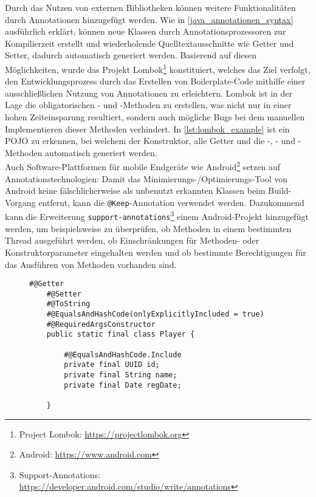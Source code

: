 \noindent Durch das Nutzen von externen Bibliotheken können weitere Funktionalitäten durch Annotationen hinzugefügt werden. Wie in \autoref{java_annotationen_syntax} ausführlich erklärt, können neue Klassen durch Annotationsprozessoren zur Kompilierzeit erstellt und wiederholende Quelltextausschnitte wie Getter und Setter, dadurch automatisch generiert werden. Basierend auf diesen Möglichkeiten, wurde das Projekt Lombok\footnote{Project Lombok: \url{https://projectlombok.org}} konstituiert, welches das Ziel verfolgt, den Entwicklungsprozess durch das Erstellen von Boilerplate-Code mithilfe einer ausschließlichen Nutzung von Annotationen zu erleichtern. Lombok ist in der Lage die obligatorischen - und -Methoden zu erstellen, was nicht nur in einer hohen Zeiteinsparung resultiert, sondern auch mögliche Bugs bei dem manuellen Implementieren dieser Methoden verhindert. In \autoref{lst:lombok_example} ist ein POJO zu erkennen, bei welchem der Konstruktor, alle Getter und die -, - und -Methoden automatisch generiert werden.\\
Auch Software-Plattformen für mobile Endgeräte wie Android\footnote{Android: \url{https://www.android.com}} setzen auf Annotationstechnologien: Damit das Minimierungs-/Optimierungs-Tool von Android keine fälschlicherweise als unbenutzt erkannten Klassen beim Build-Vorgang entfernt, kann die \texttt{@Keep}-Annotation verwendet werden. Dazukommend kann die Erweiterung \texttt{support-annotations}\footnote{Support-Annotations: \url{https://developer.android.com/studio/write/annotations}} einem Android-Projekt hinzugefügt werden, um beispielsweise zu überprüfen, ob Methoden in einem bestimmten Thread ausgeführt werden, ob Einschränkungen für Methoden- oder Konstruktorparameter eingehalten werden und ob bestimmte Berechtigungen für das Ausführen von Methoden vorhanden sind.

\begin{figure}[H]
	\begin{lstlisting}[caption=Beispiel -- Lombok POJO., captionpos=b, label=lst:lombok_example]
	#@Getter
	#@Setter
	#@ToString
	#@EqualsAndHashCode(onlyExplicitlyIncluded = true)
	#@RequiredArgsConstructor
	public static final class Player {

		#@EqualsAndHashCode.Include
		private final UUID id;
		private final String name;
		private final Date regDate;

	}
	\end{lstlisting}
\end{figure}

